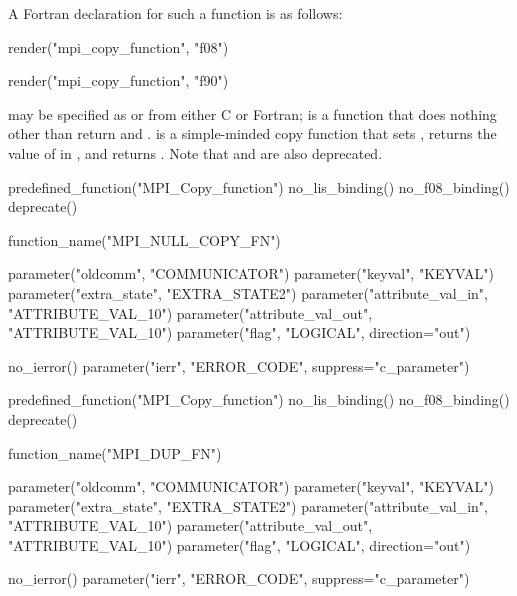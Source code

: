 A Fortran declaration for such a function is as follows:

\begin{mpi-binding}
    render("mpi_copy_function", "f08")
\end{mpi-binding}

%
\begin{mpi-binding}
    render("mpi_copy_function", "f90")
\end{mpi-binding}

 may be specified as
 or
from either C or Fortran;
is a function that does nothing other than return \mbox{}
and .
 is a simple-minded
copy function that sets \mbox{},
returns the value of
 in , and
returns .
Note that 
and  are also deprecated.

\begin{mpi-binding}
    predefined_function("MPI_Copy_function")
    no_lis_binding()
    no_f08_binding()
    deprecate()
    
    function_name("MPI_NULL_COPY_FN")
    
    parameter("oldcomm", "COMMUNICATOR")
    parameter("keyval", "KEYVAL")
    parameter("extra_state", "EXTRA_STATE2")
    parameter("attribute_val_in", "ATTRIBUTE_VAL_10")
    parameter("attribute_val_out", "ATTRIBUTE_VAL_10")
    parameter("flag", "LOGICAL", direction="out")
    
    no_ierror()
    parameter("ierr", "ERROR_CODE", suppress="c_parameter")
\end{mpi-binding}

\begin{mpi-binding}
    predefined_function("MPI_Copy_function")
    no_lis_binding()
    no_f08_binding()
    deprecate()
    
    function_name("MPI_DUP_FN")
    
    parameter("oldcomm", "COMMUNICATOR")
    parameter("keyval", "KEYVAL")
    parameter("extra_state", "EXTRA_STATE2")
    parameter("attribute_val_in", "ATTRIBUTE_VAL_10")
    parameter("attribute_val_out", "ATTRIBUTE_VAL_10")
    parameter("flag", "LOGICAL", direction="out")
    
    no_ierror()
    parameter("ierr", "ERROR_CODE", suppress="c_parameter")
\end{mpi-binding}


